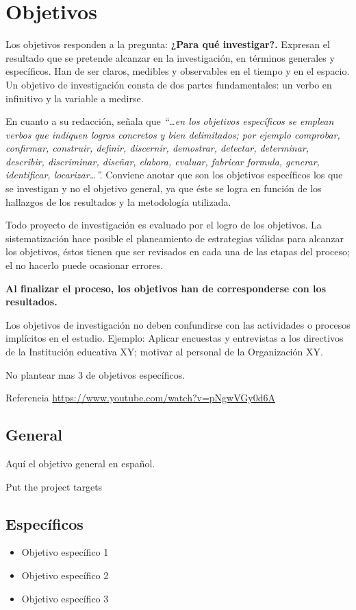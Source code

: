 \chapter{Objetivos}
\label{Objetivos}

Los objetivos responden a la pregunta: \textbf{¿Para qué investigar?.} Expresan el resultado que se pretende alcanzar en la investigación, en términos generales y específicos. Han de ser claros, medibles y observables en el tiempo y en el espacio. Un objetivo de investigación consta de dos partes fundamentales: un verbo en infinitivo y la variable a medirse.

En cuanto a su redacción, \cite{herrera2004tutoria} señala que \textit{ “…en los objetivos específicos se emplean verbos que indiquen logros concretos y bien delimitados; por ejemplo comprobar, confirmar, construir, definir, discernir, demostrar, detectar, determinar, describir, discriminar, diseñar, elabora, evaluar, fabricar formula, generar, identificar, locarizar…”.} Conviene anotar que son los objetivos específicos los que se investigan y no el objetivo general, ya que éste se logra en función de los hallazgos de los resultados y la metodología utilizada.

Todo proyecto de investigación es evaluado por el logro de los objetivos. La sistematización hace posible el planeamiento de estrategias válidas para alcanzar los objetivos, éstos tienen que ser revisados en cada una de las etapas del proceso; el no hacerlo puede ocasionar errores. 

\textbf{Al finalizar el proceso, los objetivos han de corresponderse con los resultados.}

Los objetivos de investigación no deben confundirse con las actividades o procesos 
implícitos en el estudio. Ejemplo: Aplicar encuestas y entrevistas a los directivos de la 
Institución educativa XY; motivar al personal de la Organización XY.

No plantear mas 3 de objetivos específicos.

Referencia \url{https://www.youtube.com/watch?v=pNgwVGy0d6A}

\section{General}
Aquí el objetivo general en español.

Put the project targets


\section{Específicos}
\begin{itemize}
    \item Objetivo específico 1
    \item Objetivo específico 2
    \item Objetivo específico 3
\end{itemize}


